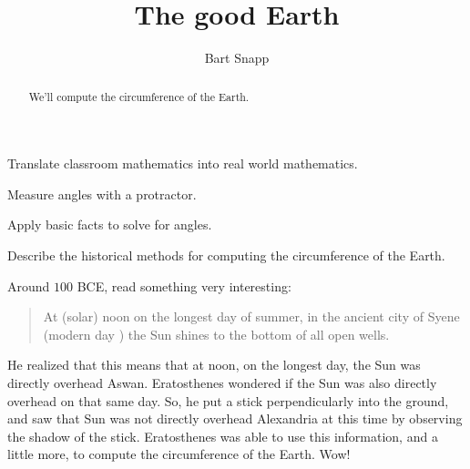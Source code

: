 \documentclass[noauthor,nooutcomes,handout]{ximera}
\title{The good Earth}
\author{Bart Snapp}
\begin{document}
\begin{abstract}
  We'll compute the circumference of the Earth.
\end{abstract}
\maketitle

\begin{listOutcomes}
\item Translate classroom mathematics into real world mathematics. 
\item Measure angles with a protractor.
\item Apply basic facts to solve for angles.
\item Describe the historical methods for computing the circumference
    of the Earth.
\end{listOutcomes}
%


  Around $100$ BCE,  read something very interesting:
  \begin{quote}
    At (solar) noon on the longest day of summer, in the ancient city of Syene
    (modern day ) the
    Sun shines to the bottom of all open wells.
  \end{quote}
  He realized that this means
  that at noon, on the longest day, the Sun was directly overhead
  Aswan. Eratosthenes wondered if the Sun was also directly overhead
   on that
  same day. So, he put a stick perpendicularly into the ground, and
  saw that Sun was not directly overhead Alexandria at this time by
  observing the shadow of the stick. Eratosthenes was able to use this
  information, and a little more, to compute the circumference of the
  Earth. Wow!
\end{document}
